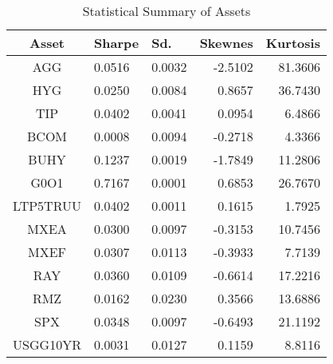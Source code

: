 \documentclass[12pt]{article}
\begin{document}
\begin{table}[!h]
\caption{Statistical Summary of Assets} %
\centering 
\begin{tabular}{ | c || p{1.5cm} p{1.5cm} r r | } 
 \hline
Asset & Sharpe  & Sd. & Skewnes & Kurtosis \\
  \hline \hline
AGG & 0.0516 & 0.0032 & -2.5102 & 81.3606\\ 
HYG & 0.0250 & 0.0084 &  0.8657 & 36.7430\\ 
TIP & 0.0402 & 0.0041 &  0.0954 &  6.4866\\ 
BCOM & 0.0008 & 0.0094 & -0.2718 &  4.3366\\ 
BUHY & 0.1237 & 0.0019 & -1.7849 & 11.2806\\ 
G0O1 & 0.7167 & 0.0001 &  0.6853 & 26.7670\\ 
LTP5TRUU & 0.0402 & 0.0011 &  0.1615 &  1.7925\\ 
MXEA & 0.0300 & 0.0097 & -0.3153 & 10.7456\\ 
MXEF & 0.0307 & 0.0113 & -0.3933 &  7.7139\\ 
RAY & 0.0360 & 0.0109 & -0.6614 & 17.2216\\ 
RMZ & 0.0162 & 0.0230 &  0.3566 & 13.6886\\ 
SPX & 0.0348 & 0.0097 & -0.6493 & 21.1192\\ 
USGG10YR & 0.0031 & 0.0127 &  0.1159 &  8.8116 \\
 \hline
\end{tabular}
\label{table:statSum}
\end{table}
\end{document}

